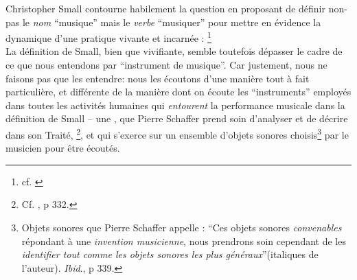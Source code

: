 \indent Christopher Small contourne habilement la question en proposant de définir non-pas le \textit{nom} ``musique'' mais le \textit{verbe} ``musiquer'' pour mettre en évidence la dynamique d'une pratique vivante et incarnée : \label{def:musicking}\footnote{cf. \cite{small_musicking:_1998}}\\
\indent La définition de Small, bien que vivifiante, semble toutefois dépasser le cadre de ce que nous entendons par ``instrument de musique''. Car justement, nous ne faisons pas que les entendre: nous les écoutons d'une manière tout à fait particulière, et différente de la manière dont on écoute les ``instruments'' employés dans toutes les activités humaines qui \textit{entourent} la performance musicale dans la définition de Small -- une , que Pierre Schaffer prend soin d'analyser et de décrire dans son Traité, \footnote{Cf. \cite{schaeffer_traite_1966}, p 332.}, et qui s'exerce sur un ensemble d'objets sonores choisis\footnote{Objets sonores que Pierre Schaffer appelle : ``Ces objets sonores \textit{convenables} répondant à une \textit{invention musicienne}, nous prendrons soin cependant de les \textit{identifier tout comme les objets sonores les plus généraux}''(italiques de l'auteur). \textit{Ibid}., p 339.} par le musicien pour être écoutés.

